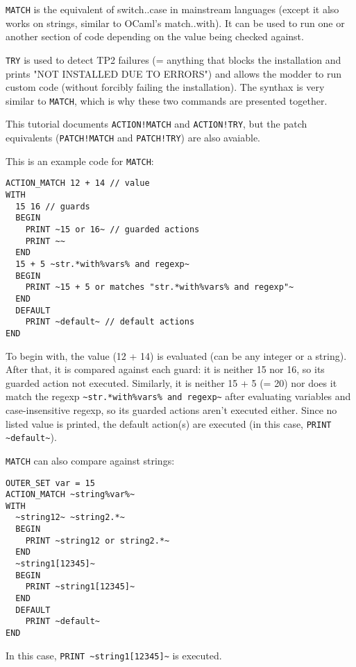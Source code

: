 \documentclass{article}
\begin{document}
\verb+MATCH+ is the equivalent of switch..case in mainstream languages (except it
also works on strings, similar to OCaml's match..with). It can be used to
run one or another section of code depending on the value being checked
against.

\verb+TRY+ is used to detect TP2 failures (= anything that blocks the installation
and prints "NOT INSTALLED DUE TO ERRORS") and allows the modder to run custom
code (without forcibly failing the installation). The synthax is very similar
to \verb+MATCH+, which is why these two commands are presented together.

This tutorial documents \verb+ACTION!MATCH+ and \verb+ACTION!TRY+, but the
patch equivalents (\verb+PATCH!MATCH+ and \verb+PATCH!TRY+) are also
avaiable.

This is an example code for \verb+MATCH+:
\begin{verbatim}
ACTION_MATCH 12 + 14 // value
WITH
  15 16 // guards
  BEGIN
    PRINT ~15 or 16~ // guarded actions
    PRINT ~~
  END
  15 + 5 ~str.*with%vars% and regexp~
  BEGIN
    PRINT ~15 + 5 or matches "str.*with%vars% and regexp"~
  END
  DEFAULT
    PRINT ~default~ // default actions
END
\end{verbatim}

To begin with, the value (12 + 14) is evaluated (can be any integer or a string).
After that, it is compared against each guard: it is neither 15 nor 16, so its
guarded action not executed. Similarly, it is neither 15 + 5 (= 20)
nor does it match the regexp \verb+~str.*with%vars% and regexp~+ after evaluating
variables and case-insensitive regexp, so
its guarded actions aren't executed either.
Since no listed value is printed, the default action(s) are executed (in this case,
\verb+PRINT ~default~+).

\verb+MATCH+ can also compare against strings:
\begin{verbatim}
OUTER_SET var = 15
ACTION_MATCH ~string%var%~
WITH
  ~string12~ ~string2.*~
  BEGIN
    PRINT ~string12 or string2.*~
  END
  ~string1[12345]~
  BEGIN
    PRINT ~string1[12345]~
  END
  DEFAULT
    PRINT ~default~
END
\end{verbatim}
In this case, \verb+PRINT ~string1[12345]~+ is executed.
\end{document}

